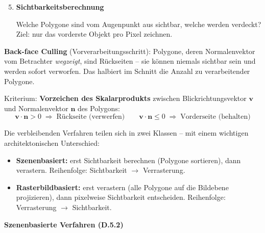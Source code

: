\documentclass[12pt, a4paper]{article}
\begin{document}

\begin{enumerate}
  \setcounter{enumi}{4}

  \item \textbf{Sichtbarkeitsberechnung}

  Welche Polygone sind vom Augenpunkt aus sichtbar, welche werden verdeckt? Ziel: nur das vorderste Objekt pro Pixel zeichnen.

\end{enumerate}

\textbf{Back-face Culling} (Vorverarbeitungsschritt): Polygone, deren Normalenvektor vom Betrachter \textit{wegzeigt}, sind Rückseiten -- sie können niemals sichtbar sein und werden sofort verworfen. Das halbiert im Schnitt die Anzahl zu verarbeitender Polygone.

Kriterium: \textbf{Vorzeichen des Skalarprodukts} zwischen Blickrichtungsvektor $\mathbf{v}$ und Normalenvektor $\mathbf{n}$ des Polygons:
\[
  \mathbf{v} \cdot \mathbf{n} > 0 \;\Rightarrow\; \text{Rückseite (verwerfen)}
  \qquad
  \mathbf{v} \cdot \mathbf{n} \leq 0 \;\Rightarrow\; \text{Vorderseite (behalten)}
\]

\medskip
Die verbleibenden Verfahren teilen sich in zwei Klassen -- mit einem wichtigen architektonischen Unterschied:

\begin{itemize}
  \item \textbf{Szenenbasiert:} erst Sichtbarkeit berechnen (Polygone sortieren), dann verastern. Reihenfolge: Sichtbarkeit $\to$ Verrasterung.
  \item \textbf{Rasterbildbasiert:} erst verastern (alle Polygone auf die Bildebene projizieren), dann pixelweise Sichtbarkeit entscheiden. Reihenfolge: Verrasterung $\to$ Sichtbarkeit.
\end{itemize}

\textbf{Szenenbasierte Verfahren (D.5.2)}
\end{document}
